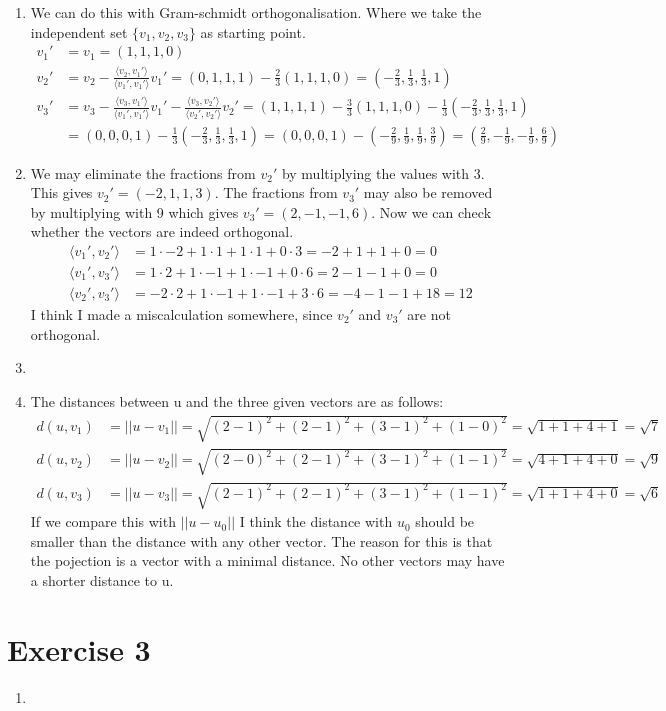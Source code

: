 \documentclass[a4paper]{article}
\begin{document}
\begin{enumerate}
  \item We can do this with Gram-schmidt orthogonalisation. Where we take the independent set $\{v_1, v_2, v_3\}$ as starting point.
  \begin{align*}
    v_1' &= v_1 = (1, 1, 1, 0) \\
    v_2' &= v_2 - \frac{\langle v_2, v_1' \rangle}{\langle v_1', v_1' \rangle}v_1' = (0, 1, 1, 1) -  \frac{2}{3}(1, 1, 1, 0) = (-\frac{2}{3}, \frac{1}{3}, \frac{1}{3}, 1) \\
    v_3' &= v_3 - \frac{\langle v_3, v_1' \rangle}{\langle v_1', v_1' \rangle}v_1' - \frac{\langle v_3, v_2' \rangle}{\langle v_2', v_2' \rangle}v_2' = (1, 1, 1, 1) - \frac{3}{3}(1, 1, 1, 0) - \frac{1}{3}(-\frac{2}{3}, \frac{1}{3}, \frac{1}{3}, 1) \\ &= (0, 0, 0, 1) - \frac{1}{3}(-\frac{2}{3}, \frac{1}{3}, \frac{1}{3}, 1) = (0, 0, 0, 1) - (-\frac{2}{9}, \frac{1}{9}, \frac{1}{9}, \frac{3}{9}) = (\frac{2}{9}, -\frac{1}{9}, -\frac{1}{9}, \frac{6}{9})
  \end{align*}
  \item We may eliminate the fractions from $v_2'$ by multiplying the values with 3. This gives $v_2' = (-2, 1, 1, 3)$. The fractions from $v_3'$ may also be removed by multiplying with 9 which gives $v_3' = (2, -1, -1, 6)$. Now we can check whether the vectors are indeed orthogonal.
  \begin{align*}
    \langle v_1', v_2' \rangle &= 1 \cdot - 2 + 1 \cdot 1 + 1 \cdot 1 + 0 \cdot 3 = -2 + 1 + 1 + 0 = 0 \\
    \langle v_1', v_3' \rangle &= 1 \cdot 2 + 1 \cdot -1 + 1 \cdot -1 + 0 \cdot 6 = 2 - 1 - 1 + 0 = 0 \\
    \langle v_2', v_3' \rangle &= -2 \cdot 2 + 1 \cdot -1 + 1 \cdot -1 + 3 \cdot 6 = -4 - 1 - 1 + 18 = 12
  \end{align*}
  I think I made a miscalculation somewhere, since $v_2'$ and $v_3'$ are not orthogonal.
  \item
  \item The distances between u and the three given vectors are as follows:
  \begin{align*}
  d(u, v_1) &= ||u - v_1|| = \sqrt{(2 - 1)^2 + (2 - 1)^2 + (3 - 1)^2 + (1 - 0)^2} = \sqrt{1 + 1 + 4 + 1} = \sqrt{7} \\
  d(u, v_2) &= ||u - v_2|| = \sqrt{(2 - 0)^2 + (2 - 1)^2 + (3 - 1)^2 + (1 - 1)^2} = \sqrt{4 + 1 + 4 + 0} = \sqrt{9} \\
  d(u, v_3) &= ||u - v_3|| = \sqrt{(2 - 1)^2 + (2 - 1)^2 + (3 - 1)^2 + (1 - 1)^2} = \sqrt{1 + 1 + 4 + 0} = \sqrt{6}
  \end{align*}
  If we compare this with $||u - u_0||$ I think the distance with $u_0$ should be smaller than the distance with any other vector. The reason for this is that the pojection is a vector with a minimal distance. No other vectors may have a shorter distance to u.

\end{enumerate}

\section*{Exercise 3}
\begin{enumerate}
  \item
\end{enumerate}
\end{document}
